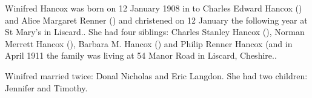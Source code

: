 
Winifred Hancox was born on 12 January 1908 in \cite{BMD1907} to Charles Edward Hancox () and Alice Margaret Renner () \cite{WHancoxBirth} and christened on 12 January the following year at St Mary's in Liscard.\cite{ParishReg}. She had four siblings: Charles Stanley Hancox (), Norman Merrett Hancox (), Barbara M. Hancox () and
Philip Renner Hancox (\p and in April 1911 the family was living at 54 Manor Road in Liscard, Cheshire.\cite{1911Census}.

Winifred married twice: Donal Nicholas and Eric Langdon.  She had two children: Jennifer and Timothy.

